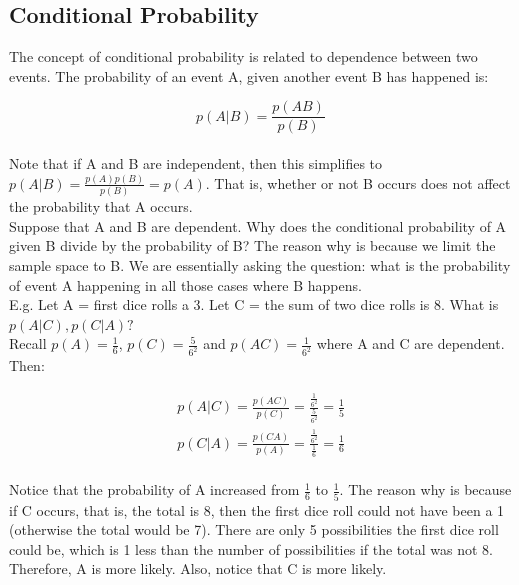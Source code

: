 \documentclass[12pt, letterpaper]{article}
\begin{document}
\subsection{Conditional Probability}
The concept of conditional probability is related to dependence between two events. The probability of an event A, given another event B has happened is:

\begin{equation}
p\left(A|B\right) = \frac{p\left(AB\right)}{p\left(B\right)}
\end{equation}\\

Note that if A and B are independent, then this simplifies to \(p\left(A|B\right) = \frac{p\left(A\right)p\left(B\right)}{p\left(B\right)} = p\left(A\right)\). That is, whether or not B occurs does not affect the probability that A occurs. \\

Suppose that A and B are dependent. Why does the conditional probability of A given B divide by the probability of B? The reason why is because we limit the sample space to B. We are essentially asking the question: what is the probability of event A happening in all those cases where B happens.\\

E.g. Let A = first dice rolls a 3. Let C = the sum of two dice rolls is 8. What is \(p\left(A|C\right), p\left(C|A\right)?\)\\

Recall \(p\left(A\right) = \frac{1}{6}\), \(p\left(C\right) = \frac{5}{6^2}\) and \(p\left(AC\right) = \frac{1}{6^2}\) where A and C are dependent. Then:

\begin{gather*}
	p\left(A|C\right) = \frac{p\left(AC\right)}{p\left(C\right)} = \frac{\frac{1}{6^2}}{\frac{5}{6^2}} = \frac{1}{5}\\
	p\left(C|A\right) = \frac{p\left(CA\right)}{p\left(A\right)} = \frac{\frac{1}{6^2}}{\frac{1}{6}} = \frac{1}{6}\\
\end{gather*}

Notice that the probability of A increased from \(\frac{1}{6}\) to \(\frac{1}{5}\). The reason why is because if C occurs, that is, the total is 8, then the first dice roll could not have been a 1 (otherwise the total would be 7). There are only 5 possibilities the first dice roll could be, which is 1 less than the number of possibilities if the total was not 8. Therefore, A is more likely. Also, notice that C is more likely.\\
\end{document}
